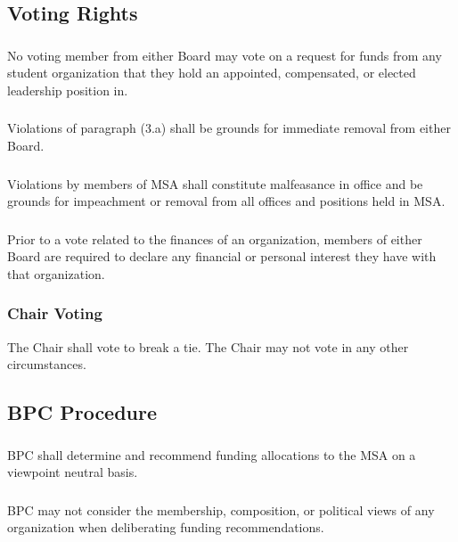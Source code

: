 \subsection{Voting Rights}
\subsubsection{}
No voting member from either Board may vote on a request for funds from any student organization that they hold an appointed, compensated, or elected leadership position in.
\subsubsection{}
Violations of paragraph (3.a) shall be grounds for immediate removal from either Board.
\subsubsection{}
Violations by members of MSA shall constitute malfeasance in office and be grounds for impeachment or removal from all offices and positions held in MSA.
\subsubsection{}
Prior to a vote related to the finances of an organization, members of either Board are required to declare any financial or personal interest they have with that organization.
\subsubsection{Chair Voting}
\subsubsubsection{}
The Chair shall vote to break a tie.
\subsubsubsection{}
The Chair may not vote in any other circumstances.

\subsection{BPC Procedure}
\subsubsection{}
BPC shall determine and recommend funding allocations to the MSA on a viewpoint neutral basis.
\subsubsection{}
BPC may not consider the membership, composition, or political views of any organization when deliberating funding recommendations.
